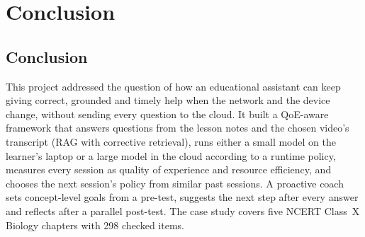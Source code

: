 \chapter{Conclusion}
\label{ch:conclusion}

\section{Conclusion}

This project addressed the question of how an educational assistant can keep giving correct, grounded and
timely help when the network and the device change, without sending every question to the cloud. It
built a QoE-aware framework that answers questions from the lesson notes and the chosen video's transcript
(RAG with corrective retrieval), runs either a small model on the learner's laptop or a large model in the
cloud according to a runtime policy, measures every session as quality of experience and resource
efficiency, and chooses the next session's policy from similar past sessions. A proactive coach sets
concept-level goals from a pre-test, suggests the next step after every answer and reflects after a
parallel post-test. The case study covers five NCERT Class~X Biology chapters with 298 checked items.

